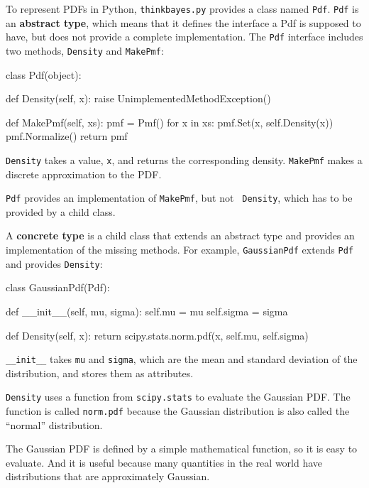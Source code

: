 \documentclass[12pt]{book}
\theoremstyle{exercise}
\begin{document}
To represent PDFs in Python,
{\tt thinkbayes.py} provides a class named {\tt Pdf}.
{\tt Pdf} is an {\bf abstract type}, which means that it defines
the interface a Pdf is supposed to have, but does not provide
a complete implementation.  The {\tt Pdf} interface includes
two methods, {\tt Density} and {\tt MakePmf}:

\begin{code}
class Pdf(object):

    def Density(self, x):
        raise UnimplementedMethodException()

    def MakePmf(self, xs):
        pmf = Pmf()
        for x in xs:
            pmf.Set(x, self.Density(x))
        pmf.Normalize()
        return pmf
\end{code}

{\tt Density} takes a value, {\tt x}, and returns the corresponding
density.  {\tt MakePmf} makes a discrete approximation to the PDF.

{\tt Pdf} provides an implementation of {\tt MakePmf}, but not {\tt
  Density}, which has to be provided by a child class.
  

A {\bf concrete type} is a child class that extends an abstract type
and provides an implementation of the missing methods.
For example, {\tt GaussianPdf} extends {\tt Pdf} and provides
{\tt Density}:

\begin{code}
class GaussianPdf(Pdf):

    def __init__(self, mu, sigma):
        self.mu = mu
        self.sigma = sigma
        
    def Density(self, x):
        return scipy.stats.norm.pdf(x, self.mu, self.sigma)
\end{code}

\verb"__init__" takes {\tt mu} and {\tt sigma}, which are
the mean and standard deviation of the distribution, and stores
them as attributes.

{\tt Density} uses a function from {\tt scipy.stats} to evaluate the
Gaussian PDF.  The function is called {\tt norm.pdf} because the
Gaussian distribution is also called the ``normal'' distribution. 

The Gaussian PDF is defined by a simple mathematical function,
so it is easy to evaluate.  And it is useful because many
quantities in the real world have distributions that are
approximately Gaussian.
\end{document}
